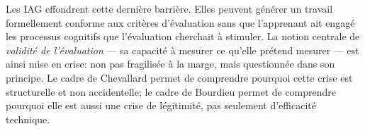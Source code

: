 Les IAG effondrent cette dernière barrière. 
Elles peuvent générer un travail formellement conforme aux critères d'évaluation sans que l'apprenant ait engagé les processus cognitifs que l'évaluation cherchait à stimuler.
La notion centrale de \emph{validité de l'évaluation} --- sa capacité à mesurer ce qu'elle prétend mesurer --- est ainsi mise en crise: non pas fragilisée à la marge, mais questionnée dans son principe. 
Le cadre de Chevallard permet de comprendre pourquoi cette crise est structurelle et non accidentelle; le cadre de Bourdieu permet de comprendre pourquoi
elle est aussi une crise de légitimité, pas seulement d'efficacité technique.